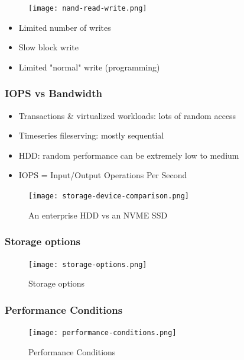\documentclass{article}
\begin{document}
\begin{figure}[H]
    \centering
    \texttt{[image: nand-read-write.png]}
    \caption{}
\end{figure}

\begin{itemize}
    \item Limited number of writes
    \item Slow block write
    \item Limited "normal" write (programming)
\end{itemize}

\subsubsection{IOPS vs Bandwidth}

\begin{itemize}
    \item Transactions \& virtualized workloads: lots of random access
    \item Timeseries fileserving: mostly sequential
    \item HDD: random performance can be extremely low to medium 
    \item IOPS = Input/Output Operations Per Second
\end{itemize}

\begin{figure}[H]
    \centering
    \texttt{[image: storage-device-comparison.png]}
    \caption{An enterprise HDD vs an NVME SSD}
\end{figure}

\subsubsection{Storage options}

\begin{figure}[H]
    \centering
    \texttt{[image: storage-options.png]}
    \caption{Storage options}
\end{figure}

\subsubsection{Performance Conditions}

\begin{figure}[H]
    \centering
    \texttt{[image: performance-conditions.png]}
    \caption{Performance Conditions}
\end{figure}
\end{document}
